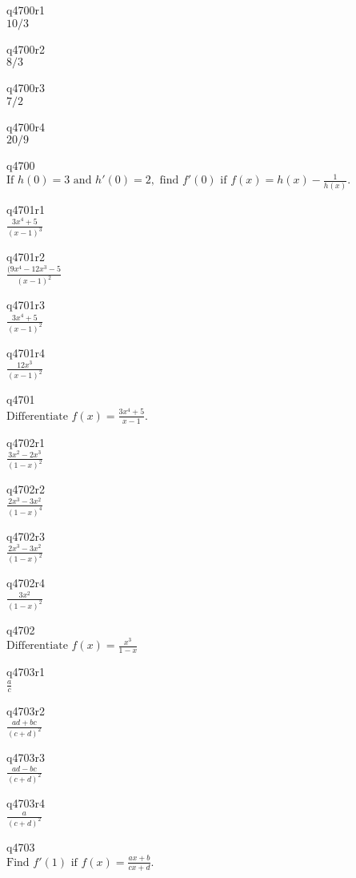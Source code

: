 q4700r1\\
\(\displaystyle 10/3 \)

q4700r2\\
\(\displaystyle 8/3 \)

q4700r3\\
\(\displaystyle 7/2 \)

q4700r4\\
\(\displaystyle 20/9 \)

q4700\\
\(\displaystyle \text{If } h(0) = 3 \text{ and } h'(0) = 2, \text{ find } f'(0) \text{ if } f(x) = h(x) - \frac{1}{h(x)}. \)

q4701r1\\
\(\displaystyle \frac{3x^4 + 5}{(x-1)^3} \)

q4701r2\\
\(\displaystyle \frac{(9x^4 - 12x^3 - 5}{(x-1)^2} \)

q4701r3\\
\(\displaystyle \frac{3x^4 + 5}{(x-1)^2} \)

q4701r4\\
\(\displaystyle \frac{12x^3}{(x-1)^2} \)

q4701\\
\(\displaystyle \text{Differentiate } f(x) = \frac{3x^4 + 5}{x-1}. \)

q4702r1\\
\(\displaystyle \frac{3x^2 - 2x^3}{(1-x)^2} \)

q4702r2\\
\(\displaystyle \frac{2x^3 - 3x^2}{(1-x)^4} \)

q4702r3\\
\(\displaystyle \frac{2x^3 - 3x^2}{(1-x)^2} \)

q4702r4\\
\(\displaystyle \frac{3x^2}{(1-x)^2} \)

q4702\\
\(\displaystyle \text{Differentiate } f(x) = \frac{x^3}{1-x} \)

q4703r1\\
\(\displaystyle \frac{a}{c} \)

q4703r2\\
\(\displaystyle \frac{ad + bc}{(c+d)^2} \)

q4703r3\\
\(\displaystyle \frac{ad - bc}{(c+d)^2} \)

q4703r4\\
\(\displaystyle \frac{a}{(c+d)^2} \)

q4703\\
\(\displaystyle \text{Find } f'(1) \text{ if } f(x) = \frac{ax+b}{cx+d}. \)

